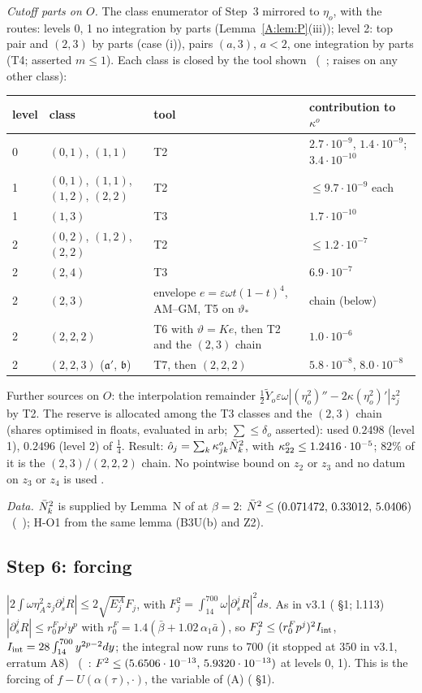 \documentclass[11pt]{article}
\begin{document}
\emph{Cutoff parts on $O$.} The class enumerator of Step~3 mirrored to $\eta_o$, with the routes: levels 0, 1 no integration by parts (Lemma~\ref{A:lem:P}(iii)); level 2: top pair and $(2,3)$ by parts (case (i)), pairs $(a,3)$, $a<2$, one integration by parts (T4; asserted $m\le1$). Each class is closed by the tool shown \tC\ (\SA\ ;  raises on any other class):
\begin{center}\small\begin{tabular}{@{}llll@{}}\toprule level & class & tool & contribution to $\kappa^o$\\\midrule
0 & $(0,1)$, $(1,1)$ & T2 & $2.7\cdot10^{-9}$, $1.4\cdot10^{-9}$; $3.4\cdot10^{-10}$\\
1 & $(0,1)$, $(1,1)$, $(1,2)$, $(2,2)$ & T2 & $\le9.7\cdot10^{-9}$ each\\
1 & $(1,3)$ & T3 & $1.7\cdot10^{-10}$\\
2 & $(0,2)$, $(1,2)$, $(2,2)$ & T2 & $\le1.2\cdot10^{-7}$\\
2 & $(2,4)$ & T3 & $6.9\cdot10^{-7}$\\
2 & $(2,3)$ & envelope $e=\varepsilon\omega t(1-t)^4$, AM--GM, T5 on $\vartheta_*$ & chain (below)\\
2 & $(2,2,2)$ & T6 with $\vartheta=Ke$, then T2 and the $(2,3)$ chain & $1.0\cdot10^{-6}$\\
2 & $(2,2,3)$ ($\mathfrak a'$, $\mathfrak b$) & T7, then $(2,2,2)$ & $5.8\cdot10^{-8}$, $8.0\cdot10^{-8}$\\\bottomrule\end{tabular}\end{center}
Further sources on $O$: the interpolation remainder $\frac12\tilde Y_o\varepsilon\omega|(\eta_o^2)''-2\kappa(\eta_o^2)'|z_j^2$ by T2. The reserve is allocated among the T3 classes and the $(2,3)$ chain (shares optimised in floats, evaluated in arb; $\sum\le\delta_o$ asserted): used $0.2498$ (level 1), $0.2496$ (level 2) of $\frac14$. Result: $\hat o_j=\sum_k\kappa^o_{jk}\bar N_k^2$, with $\kappa^o_{22}\le1.2416\cdot10^{-5}$; $82\%$ of it is the $(2,3)$/$(2,2,2)$ chain. No pointwise bound on $z_2$ or $z_3$ and no datum on $z_3$ or $z_4$ is used \tC.

\emph{Data.} $\bar N_k^2$ is supplied by Lemma~N of  at $\beta=2$: $\bar N^2\le(0.071472,\,0.33012,\,5.0406)$ \tC\ (\SU\ ); H-O1 from the same lemma (B3U(b) and Z2).

\subsection{Step 6: forcing}\label{A:sec:forcing}
$|2\int\omega\eta_A^2z_j\partial_s^jR|\le2\sqrt{E^A_j}F_j$, with $F_j^2=\int_{14}^{700}\omega|\partial_s^jR|^2ds$. As in v3.1 ( \S1;  l.113) $|\partial_s^jR|\le r^F_0p^jy^p$ with $r^F_0=1.4(\bar\beta+1.02\,\alpha_1\bar a)$, so $F_j^2\le(r_0^Fp^j)^2I_{\rm int}$, $I_{\rm int}=28\int_{14}^{700}y^{2p-2}dy$; the integral now runs to $700$ (it stopped at $350$ in v3.1, erratum A8) \tC\ (\SA\ : $F^2\le(5.6506\cdot10^{-13},\,5.9320\cdot10^{-13})$ at levels 0, 1). This is the forcing of $f-U(\alpha(\tau),\cdot)$, the variable of (A) ( \S1).
\end{document}
